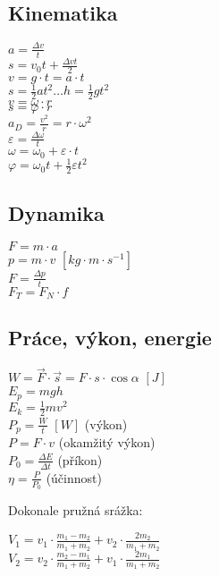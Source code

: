 \documentclass{article}
\begin{document}
\subsection*{Kinematika}
\begin{multicols}{4}
\noindent$a=\frac{\Delta v}{t}$\\
$s=v_0t+\frac{\Delta v t}{2}$\\
$v=g\cdot t=a\cdot t$\\
$s=\frac{1}{2}at^2 \dots h=\frac{1}{2}gt^2$\\
$v=\omega \cdot r$\\
$s=\varphi \cdot r$\\
$a_D=\frac{v^2}{r}=r\cdot\omega^2$\\
$\varepsilon = \frac{\Delta \omega}{t}$\\
$\omega=\omega_0+\varepsilon\cdot t$\\
$\varphi=\omega_0t+\frac{1}{2}\varepsilon t^2$\\
\end{multicols}

\subsection*{Dynamika}
\begin{multicols}{4}
\noindent $F=m\cdot a$\\
$p=m\cdot v$ $\left[kg\cdot m\cdot s^{-1}\right]$\\
$F=\frac{\Delta p}{t}$\\
$F_T=F_N\cdot f$
\end{multicols}

\subsection*{Práce, výkon, energie}
\begin{multicols}{3}
\noindent $W=\vec{F}\cdot\vec{s}=F\cdot s \cdot \cos{\alpha}$ $[J]$\\
$E_p=mgh$\\
$E_k=\frac{1}{2}mv^2$\\
$P_p=\frac{W}{t}$ $[W]$ (výkon)\\
$P=F\cdot v$ (okamžitý výkon)\\
$P_0=\frac{\Delta E}{\Delta t}$ (příkon)\\
$\eta=\frac{P}{P_0}$ (účinnost)\\
\end{multicols}

\noindent Dokonale pružná srážka:
\begin{multicols}{2}
\noindent $V_1=v_1\cdot \frac{m_1-m_2}{m_1+m_2}+v_2\cdot \frac{2m_2}{m_1+m_2}$\\
$V_2=v_2\cdot \frac{m_2-m_1}{m_1+m_2}+v_1\cdot \frac{2m_1}{m_1+m_2}$
\end{multicols}
\end{document}
